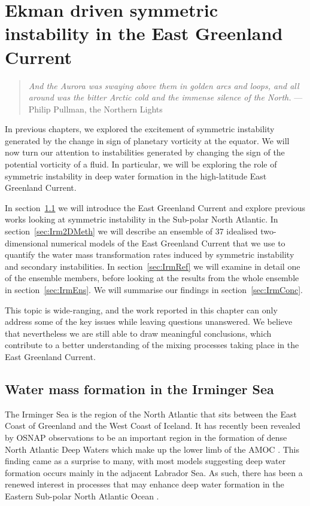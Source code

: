\chapter{Ekman driven symmetric instability in the East Greenland Current}
\label{chap:5}
\begin{quote}
     \textit{And the Aurora was swaying above them in golden arcs and loops, and all around was the bitter Arctic cold and the immense silence of the North.} --- Philip Pullman, the Northern Lights
\end{quote}

In previous chapters, we explored the excitement of symmetric instability generated by the change in sign of planetary vorticity at the equator. We will now turn our attention to instabilities generated by changing the sign of the potential vorticity of a fluid. In particular, we will be exploring the role of symmetric instability in deep water formation in the high-latitude East Greenland Current.

In section~\ref{sec:IrmIntro} we will introduce the East Greenland Current and explore previous works looking at symmetric instability in the Sub-polar North Atlantic. In section~\ref{sec:Irm2DMeth} we will describe an ensemble of 37 idealised two-dimensional numerical models of the East Greenland Current that we use to quantify the water mass transformation rates induced by symmetric instability and secondary instabilities. In section~\ref{sec:IrmRef} we will examine in detail one of the ensemble members, before looking at the results from the whole ensemble in section~\ref{sec:IrmEns}. We will summarise our findings in section~\ref{sec:IrmConc}.

This topic is wide-ranging, and the work reported in this chapter can only address some of the key issues while leaving questions unanswered. We believe that nevertheless we are still able to draw meaningful conclusions, which contribute to a better understanding of the mixing processes taking place in the East Greenland Current.

\section{Water mass formation in the Irminger Sea}
\label{sec:IrmIntro}
The Irminger Sea is the region of the North Atlantic that sits between the East Coast of Greenland and the West Coast of Iceland. It has recently been revealed by OSNAP observations to be an important region in the formation of dense North Atlantic Deep Waters which make up the lower limb of the AMOC \citep{Lozier2019}. This finding came as a surprise to many, with most models suggesting deep water formation occurs mainly in the adjacent Labrador Sea. As such, there has been a renewed interest in processes that may enhance deep water formation in the Eastern Sub-polar North Atlantic Ocean \citep[e.g.][]{Josey2019, LeBras2022, DeJong2016}.

